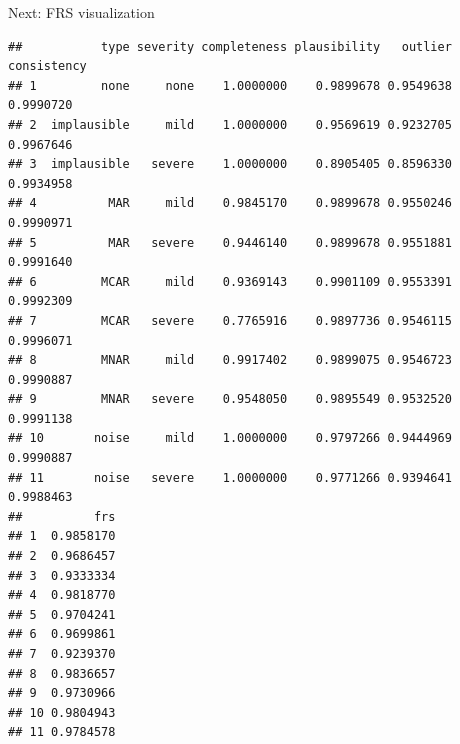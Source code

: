 \documentclass[
]{article}
\newenvironment{Shaded}{\begin{snugshade}}{\end{snugshade}}
\newcommand{\AttributeTok}[1]{\textcolor[rgb]{0.13,0.29,0.53}{#1}}
\newcommand{\CommentTok}[1]{\textcolor[rgb]{0.56,0.35,0.01}{\textit{#1}}}
\newcommand{\FunctionTok}[1]{\textcolor[rgb]{0.13,0.29,0.53}{\textbf{#1}}}
\newcommand{\NormalTok}[1]{#1}
\newcommand{\OtherTok}[1]{\textcolor[rgb]{0.56,0.35,0.01}{#1}}
\newcommand{\SpecialCharTok}[1]{\textcolor[rgb]{0.81,0.36,0.00}{\textbf{#1}}}
\begin{document}
\begin{Shaded}
\end{Shaded}

Next: FRS visualization

\begin{Shaded}
\end{Shaded}

\begin{verbatim}
##           type severity completeness plausibility   outlier consistency
## 1         none     none    1.0000000    0.9899678 0.9549638   0.9990720
## 2  implausible     mild    1.0000000    0.9569619 0.9232705   0.9967646
## 3  implausible   severe    1.0000000    0.8905405 0.8596330   0.9934958
## 4          MAR     mild    0.9845170    0.9899678 0.9550246   0.9990971
## 5          MAR   severe    0.9446140    0.9899678 0.9551881   0.9991640
## 6         MCAR     mild    0.9369143    0.9901109 0.9553391   0.9992309
## 7         MCAR   severe    0.7765916    0.9897736 0.9546115   0.9996071
## 8         MNAR     mild    0.9917402    0.9899075 0.9546723   0.9990887
## 9         MNAR   severe    0.9548050    0.9895549 0.9532520   0.9991138
## 10       noise     mild    1.0000000    0.9797266 0.9444969   0.9990887
## 11       noise   severe    1.0000000    0.9771266 0.9394641   0.9988463
##          frs
## 1  0.9858170
## 2  0.9686457
## 3  0.9333334
## 4  0.9818770
## 5  0.9704241
## 6  0.9699861
## 7  0.9239370
## 8  0.9836657
## 9  0.9730966
## 10 0.9804943
## 11 0.9784578
\end{verbatim}
\end{document}
